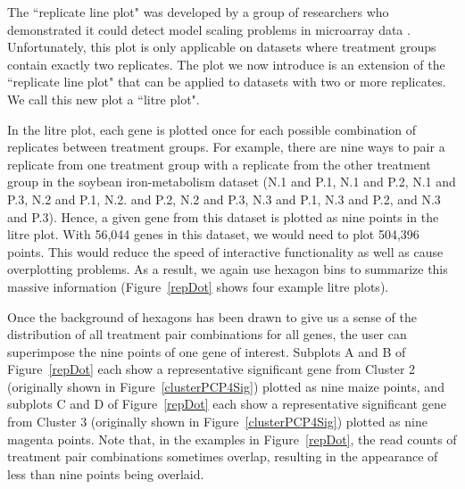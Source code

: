\documentclass{bioinfo}
\begin{document}
The ``replicate line plot" was developed by a group of researchers who demonstrated it could detect model scaling problems in microarray data \citep{Cook}. Unfortunately, this plot is only applicable on datasets where treatment groups contain exactly two replicates. The plot we now introduce is an extension of the ``replicate line plot" that can be applied to datasets with two or more replicates. We call this new plot a ``litre plot".

In the litre plot, each gene is plotted once for each possible combination of replicates between treatment groups. For example, there are nine ways to pair a replicate from one treatment group with a replicate from the other treatment group in the soybean iron-metabolism dataset (N.1 and P.1, N.1 and P.2, N.1 and P.3, N.2 and P.1, N.2. and P.2, N.2 and P.3, N.3 and P.1, N.3 and P.2, and N.3 and P.3). Hence, a given gene from this dataset is plotted as nine points in the litre plot. With 56,044 genes in this dataset, we would need to plot 504,396 points. This would reduce the speed of interactive functionality as well as cause overplotting problems. As a result, we again use hexagon bins to summarize this massive information (Figure~\ref{repDot} shows four example litre plots).

Once the background of hexagons has been drawn to give us a sense of the distribution of all treatment pair combinations for all genes, the user can superimpose the nine points of one gene of interest. Subplots A and B of Figure~\ref{repDot} each show a representative significant gene from Cluster 2 (originally shown in Figure~\ref{clusterPCP4Sig}) plotted as nine maize points, and subplots C and D of Figure~\ref{repDot} each show a representative significant gene from Cluster 3 (originally shown in Figure~\ref{clusterPCP4Sig}) plotted as nine magenta points. Note that, in the examples in Figure~\ref{repDot}, the read counts of treatment pair combinations sometimes overlap, resulting in the appearance of less than nine points being overlaid.
\end{document}
